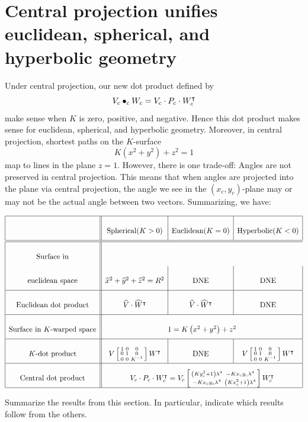 \documentclass{ximera}
\begin{document}
\section{Central projection unifies euclidean, spherical, and hyperbolic geometry}

Under central projection, our new dot product defined by
\[
V_c\bullet_c W_c = V_c\cdot P_c\cdot W_c^\intercal
\]
make sense when $K$ is zero, positive, and negative. Hence this dot
product makes sense for euclidean, spherical, and hyperbolic
geometry. Moreover, in central projection, shortest paths on the $K$-surface
\[
K\left(x^2 + y^2\right) + z^2 = 1
\]
map to lines in the plane $z=1$. However, there is one trade-off:
Angles are not preserved in central projection. This means that when
angles are projected into the plane via central projection, the angle
we see in the $(x_c,y_c)$-plane may or may not be the actual angle
between two vectors. Summarizing, we have:



\[
{\renewcommand{\arraystretch}{2.7}
  \begin{array}{|c||c|c|c|}\hline
    & \text{Spherical} (K>0)& \text{Euclidean} (K=0)& \text{Hyperbolic} (K<0)\\\hline\hline
    \text{Surface in} \\ \text{euclidean space} & \hat{x}^{2}+\hat{y}^{2}+\hat{z}^{2}=R^{2} & \text{DNE}  & \text{DNE} \\\hline
    \text{Euclidean dot product} & \hat{V}\cdot \hat{W}^\transpose & \hat{V}\cdot \hat{W}^\transpose  & \text{DNE}\\\hline
     \text{Surface in $K$-warped space}& \multicolumn{3}{c|}{1=K\left(  x^{2}+y^{2}\right)  +z^{2}}\\\hline
     \text{$K$-dot product} & V\left[\begin{smallmatrix}1 & 0 & 0\\ 0 & 1 & 0\\ 0 & 0 & K^{-1}\end{smallmatrix}\right] W^\transpose &  \text{DNE} & V\left[\begin{smallmatrix}1 & 0 & 0\\ 0 & 1 & 0\\ 0 & 0 & K^{-1}\end{smallmatrix}\right]W^\transpose\\\hline
     \text{Central dot product} & \multicolumn{3}{c|}{V_c\cdot P_c\cdot W_c^\transpose = V_c\left[\begin{smallmatrix}\left(Ky_c^2+1\right)\lambda^4 & -Kx_{c}y_{c}\lambda^4\\
    -Kx_{c}y_{c}\lambda^4 & \left(Kx_c^2+1\right)\lambda^4\end{smallmatrix}\right] W_c^\transpose}\\\hline
\end{array}}
\]




\begin{problem}
Summarize the results from this section. In particular, indicate which
results follow from the others.
\begin{freeResponse}
\end{freeResponse}
\end{problem}
\end{document}
